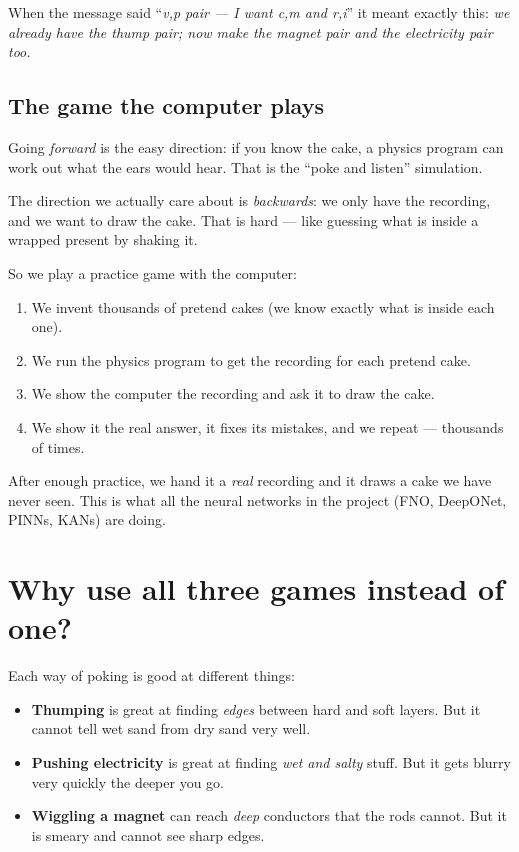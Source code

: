 \documentclass[11pt,a4paper]{article}
\begin{document}
When the message said ``\emph{v,p pair --- I want c,m and r,i}'' it meant exactly this:
\emph{we already have the thump pair; now make the magnet pair and the electricity pair too.}

\subsection*{The game the computer plays}

Going \emph{forward} is the easy direction: if you know the cake, a physics program can
work out what the ears would hear. That is the ``poke and listen'' simulation.

The direction we actually care about is \emph{backwards}: we only have the recording,
and we want to draw the cake. That is hard --- like guessing what is inside a wrapped
present by shaking it.

So we play a practice game with the computer:
\begin{enumerate}[leftmargin=2em]
  \item We invent thousands of pretend cakes (we know exactly what is inside each one).
  \item We run the physics program to get the recording for each pretend cake.
  \item We show the computer the recording and ask it to draw the cake.
  \item We show it the real answer, it fixes its mistakes, and we repeat --- thousands of times.
\end{enumerate}
After enough practice, we hand it a \emph{real} recording and it draws a cake we have never seen.
This is what all the neural networks in the project (FNO, DeepONet, PINNs, KANs) are doing.

\section*{Why use all three games instead of one?}

Each way of poking is good at different things:

\begin{itemize}[leftmargin=2em]
  \item \textcolor{seismic}{\textbf{Thumping}} is great at finding \emph{edges} between hard and soft layers.
        But it cannot tell wet sand from dry sand very well.
  \item \textcolor{electric}{\textbf{Pushing electricity}} is great at finding \emph{wet and salty} stuff.
        But it gets blurry very quickly the deeper you go.
  \item \textcolor{magnet}{\textbf{Wiggling a magnet}} can reach \emph{deep} conductors that the rods cannot.
        But it is smeary and cannot see sharp edges.
\end{itemize}
\end{document}
